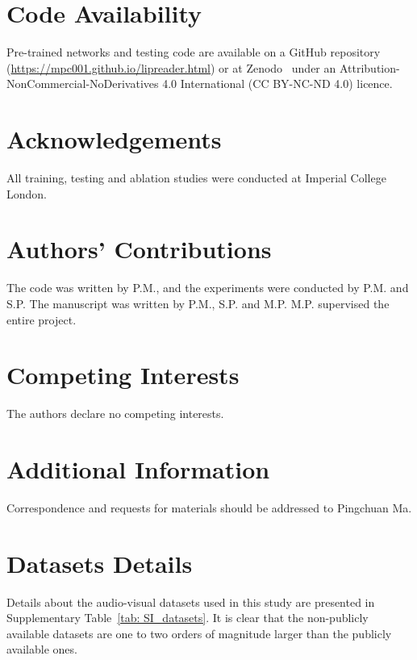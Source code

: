 \documentclass[twocolumn]{article}
\begin{document}
\section*{Code Availability} 
Pre-trained networks and testing code are available on a GitHub repository (\url{https://mpc001.github.io/lipreader.html}) or at Zenodo~\cite{pingchuan_ma_2022_6651667} under an Attribution-NonCommercial-NoDerivatives 4.0 International (CC BY-NC-ND 4.0) licence.

\section*{Acknowledgements}
All training, testing and ablation studies were conducted at Imperial College London.

\section*{Authors' Contributions} 
The code was written by P.M., and the experiments were conducted by P.M. and S.P. The manuscript was written by P.M., S.P. and M.P. M.P. supervised the entire project.

\section*{Competing Interests}
The authors declare no competing interests.

\section*{Additional Information} 
Correspondence and requests for materials should be addressed to Pingchuan Ma.




\clearpage

\setcounter{section}{-1}
\setcounter{table}{-1}
\setcounter{equation}{-1}
\setcounter{figure}{-1}
\renewcommand{\thesection}{S\arabic{section}}
\renewcommand{\thetable}{S\arabic{table}}
\renewcommand\theequation{S\arabic{equation}}
\renewcommand\thefigure{S\arabic{figure}}

\section{Datasets Details}
Details about the audio-visual datasets used in this study are presented in Supplementary Table~\ref{tab: SI_datasets}. It is clear that the non-publicly available datasets are one to two orders of magnitude larger than the publicly available ones. 
\end{document}
